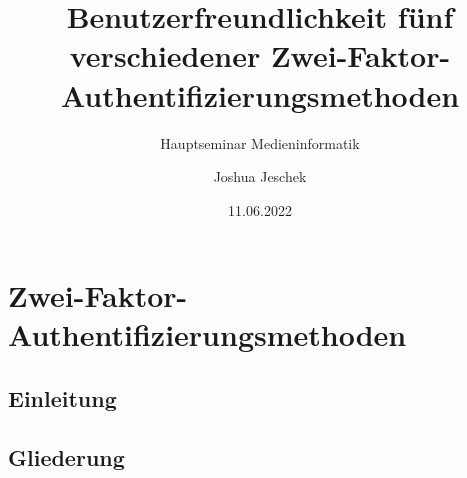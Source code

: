 \usepackage[T1]{fontenc}
\usepackage[utf8]{inputenc}
\usepackage[ngerman]{babel}
\usepackage{tikz} %
\usepackage{endnotes} %

\usepackage[nobiblatex]{xurl}

\usepackage{nameref}
\makeatletter
\newcommand*{\currentsectionname}{\@currentlabelname}
\makeatother



\graphicspath{ {./images/} }

\nocite{*}


\newcommand{\Title}{Benutzerfreundlichkeit fünf verschiedener Zwei-Faktor-Authentifizierungsmethoden}
\newcommand{\ShortTitle}{Zwei-Faktor-Authentifizierungsmethoden}
\title[\ShortTitle]{\Title}
\subtitle{Hauptseminar Medieninformatik}
\author{Joshua Jeschek}
\date{11.06.2022}



\tucthreeheadlines{}
\frame{\titlepage}

\tuctwoheadlines{}
\section*{\ShortTitle}
\subsection{Einleitung}


\subsection{Gliederung}

